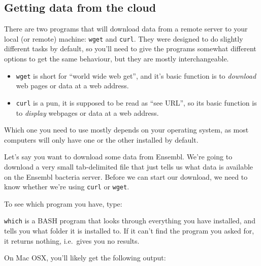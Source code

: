 \documentclass[
  letterpaper,
  DIV=11,
  numbers=noendperiod]{scrreprt}
\newenvironment{Shaded}{\begin{snugshade}}{\end{snugshade}}
\newcommand{\ExtensionTok}[1]{\textcolor[rgb]{0.00,0.23,0.31}{#1}}
\newcommand{\NormalTok}[1]{\textcolor[rgb]{0.00,0.23,0.31}{#1}}
\begin{document}
\subsection{\texorpdfstring{\textbf{Getting data from the
cloud}}{Getting data from the cloud}}\label{getting-data-from-the-cloud}

There are two programs that will download data from a remote server to
your local (or remote) machine: \texttt{wget} and \texttt{curl}. They
were designed to do slightly different tasks by default, so you'll need
to give the programs somewhat different options to get the same
behaviour, but they are mostly interchangeable.

\begin{itemize}
\item
  \texttt{wget} is short for ``world wide web get'', and it's basic
  function is to \emph{download} web pages or data at a web address.
\item
  \texttt{curl} is a pun, it is supposed to be read as ``see URL'', so
  its basic function is to \emph{display} webpages or data at a web
  address.
\end{itemize}

Which one you need to use mostly depends on your operating system, as
most computers will only have one or the other installed by default.

Let's say you want to download some data from Ensembl. We're going to
download a very small tab-delimited file that just tells us what data is
available on the Ensembl bacteria server. Before we can start our
download, we need to know whether we're using \texttt{curl} or
\texttt{wget}.

To see which program you have, type:

\begin{Shaded}
\end{Shaded}

\texttt{which} is a BASH program that looks through everything you have
installed, and tells you what folder it is installed to. If it can't
find the program you asked for, it returns nothing, i.e.~gives you no
results.

On Mac OSX, you'll likely get the following output:

\begin{Shaded}
\end{Shaded}
\end{document}
